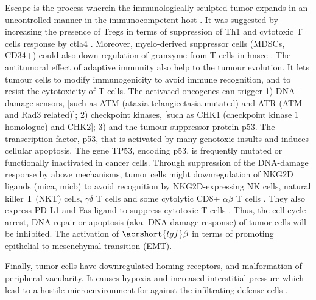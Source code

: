 \documentclass[12pt, a4paper]{article}
\begin{document}
Escape is the process wherein the immunologically sculpted tumor expands in an uncontrolled manner in the immunocompetent host \citep{Dunn2002, Dunn2004}.
It was suggested by increasing the presence of Tregs in terms of suppression of Th1 and cytotoxic T cells response by \acrfull{ctla4} \citep{Halvorsen2014}.
Moreover, myelo-derived suppressor cells (MDSCs, CD34+) could also down-regulation of granzyme from T cells in \acrshort{hnscc} \citep{Si2019}.
The antitumoral effect of adaptive immunity also help to the tumour evolution. It lets tumour cells to modify immunogenicity to avoid immune recognition, and to resist the cytotoxicity of T cells.
The activated oncogenes can trigger 1) DNA-damage sensors, [such as ATM (ataxia-telangiectasia mutated) and ATR (ATM and Rad3 related)]; 2) checkpoint kinases, [such as CHK1 (checkpoint kinase 1 homologue) and CHK2]; 3) and the tumour-suppressor protein p53. 
The transcription factor, p53, that is activated by many genotoxic insults and induces cellular apoptosis. The gene TP53, encoding p53, is frequently mutated or functionally inactivated in cancer cells.
Through suppression of the DNA-damage response by above mechanisms, tumor cells might downregulation of NKG2D ligands (\acrshort{mica}, \acrshort{micb}) to avoid recognition by NKG2D-expressing NK cells, natural killer T (NKT) cells, $\gamma\delta$ T cells and some cytolytic CD8+ $\alpha\beta$ T cells \citep{Ljunggren2007}. They also express PD‐L1 and Fas ligand to suppress cytotoxic T cells \citep{Zitvogel2006}. Thus, the cell-cycle arrest, DNA repair or apoptosis (aka. DNA-damage response) of tumor cells will be inhibited.
The activation of $\acrshort{tgf}\beta$ in terms of promoting epithelial-to-mesenchymal transition (EMT). 

Finally, tumor cells have downregulated homing receptors, and malformation of peripheral vacularity. It causes hypoxia and increased interstitial pressure which lead to a hostile microenvironment for against the infiltrating defense cells \citep{Ljunggren2007}.
\end{document}
